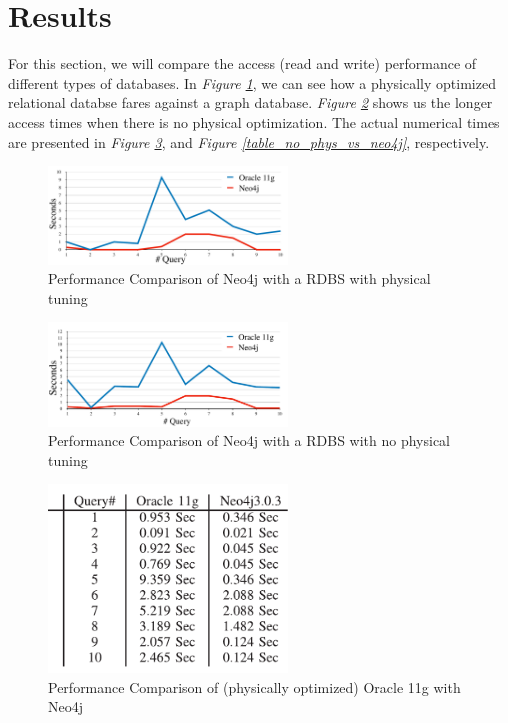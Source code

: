 \documentclass[10pt,        %
               a4paper,     %
               journal,     %
               ]{IEEEtran}
\begin{document}
\section{Results} 
For this section, we will compare the access (read and write) performance of different types of databases. In \textit{Figure \ref{graph_phys_vs_neo4j}}, we can see how a physically optimized relational databse fares against a graph database. \textit{Figure \ref{graph_no_phys_vs_neo4j}} shows us the longer access times when there is no physical optimization. The actual numerical times are presented in \textit{Figure \ref{table_phys_vs_neo4j}}, and \textit{Figure \ref{table_no_phys_vs_neo4j}}, respectively. \par
\begin{figure}[!t]
	\centering
	\includegraphics[width=2.5in]{plots/phys_vs_neo4j}
	\caption{Performance Comparison of Neo4j with a RDBS with physical tuning \cite{IEEEpaper1:comparison}}
	\label{graph_phys_vs_neo4j}
\end{figure}

\begin{figure}[!t]
	\centering
	\includegraphics[width=2.5in]{plots/no phys vs neo4j}
	\caption{Performance Comparison of Neo4j with a RDBS with no physical tuning \cite{IEEEpaper1:comparison}}
	\label{graph_no_phys_vs_neo4j}
\end{figure}

\begin{figure}[!t]
	\centering
	\includegraphics[width=2.5in]{plots/phys vs neo4j table}
	\caption{Performance Comparison of (physically optimized) Oracle 11g with Neo4j \cite{IEEEpaper1:comparison}}
	\label{table_phys_vs_neo4j}
\end{figure}
\end{document}

